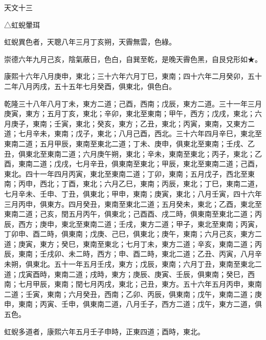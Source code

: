 
\begin{pinyinscope}
天文十三

△虹蜺暈珥

虹蜺異色者，天聰八年三月丁亥朔，天霽無雲，色綠。

崇德六年九月己亥，陰氣蔽日，色白，自巽至乾，是晚天霽色黑，自艮兌形如★。

康熙十六年八月庚申，東北；三十六年六月丁巳，東南；四十六年二月癸卯，五十二年八月丙戌，五十五年七月癸酉，俱東北，俱色白。

乾隆三十八年八月丁未，東方二道；己酉，西南；戊辰，東方二道。三十一年三月庚寅，東方；五月丁亥，東北；辛卯，東北至東南；甲午，西方；戊戌，東北；六月庚子，東南；壬寅，東北；癸亥，東方；乙丑，東北；丙寅，東南，又東方二道；七月辛未，東南；戊子，東北；八月己酉，西北。三十六年四月辛巳，東北至東南二道；五月甲辰，東南至東北二道；丁未、庚申，俱東北至東南；壬戌、乙丑，俱東北至東南二道；六月庚午朔，東北；辛未，東南至東北；丙子，東北；乙酉，東南二道；戊戌，七月辛丑，俱東南至東北；甲辰，東北至東南二道；己酉，東北。四十一年四月丙寅，東北至東南二道；丁卯，東南；五月戊子，西北至東南；丙申，西北；丁酉，東北；六月乙巳，東南；丙辰，東北；丁巳，東南二道，七月辛未、壬申、丁丑，俱東北；甲申，東南；庚寅，東北；八月壬寅，四十六年三月丙申，俱東方。四月癸丑，東南至東北二道；五月癸未，東北；乙酉，東北至東南二道；己亥，閏五月丙午，俱東北；己酉酉、戌二時，俱東南至東北二道；丙辰，西方；庚申，東北至東南二道；壬戌，東方二道；甲子，東北至東南；丙寅，丁卯申、酉二時，俱東南；戊庚、己巳，俱東北；庚午，東南；六月己亥，東方二道；庚寅，東方；癸巳，東南至東北；七月丁未，東方二道；辛亥，東南二道；丙辰，東南；壬戌卯、未二時，西方；申、酉二時，東北二道；乙丑、丙寅，八月辛未朔，俱東北。五十一年五月壬戌，東方；戊辰，東南；六月丁丑，東南至東北二道；戊寅酉時，東南二道；戌時，東方；庚辰、庚寅、壬辰，俱東南；癸巳，西南；七月甲辰，東南；閏七月丙戌，東北；己丑，東方。五十六年五月丙申，東南二道；壬寅，東南；六月癸丑，西南；乙卯、丙辰，俱東南；戊午，東南二道；庚申，東南；丙寅、壬申，俱東南二道，八月壬子，西方二道；戊午，東方二道，俱五色。

虹蜺多道者，康熙六年五月壬子申時，正東四道；酉時，東北。


\end{pinyinscope}
